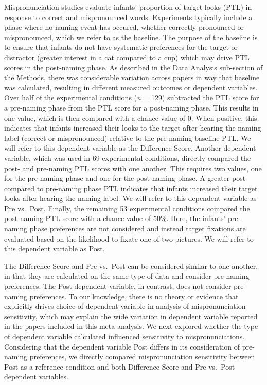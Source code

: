 \documentclass[man]{apa6}
\theoremstyle{definition}
\theoremstyle{definition}
\theoremstyle{definition}
\theoremstyle{remark}
\begin{document}
Mispronunciation studies evaluate infants' proportion of target looks
(PTL) in response to correct and mispronounced words. Experiments
typically include a phase where no naming event has occured, whether
correctly pronounced or mispronounced, which we refer to as the
baseline. The purpose of the baseline is to ensure that infants do not
have systematic preferences for the target or distractor (greater
interest in a cat compared to a cup) which may drive PTL scores in the
post-naming phase. As described in the Data Analysis sub-section of the
Methods, there was considerable variation across papers in way that
baseline was calculated, resulting in different measured outcomes or
dependent variables. Over half of the experimental conditions (\emph{n}
= 129) subtracted the PTL score for a pre-naming phase from the PTL
score for a post-naming phase. This results in one value, which is then
compared with a chance value of 0. When positive, this indicates that
infants increased their looks to the target after hearing the naming
label (correct or mispronounced) relative to the pre-naming baseline
PTL. We will refer to this dependent variable as the Difference Score.
Another dependent variable, which was used in 69 experimental
conditions, directly compared the post- and pre-naming PTL scores with
one another. This requires two values, one for the pre-naming phase and
one for the post-naming phase. A greater post compared to pre-naming
phase PTL indicates that infants increased their target looks after
hearing the naming label. We will refer to this dependent variable as
Pre vs.~Post. Finally, the remaining 53 experimental conditions compared
the post-naming PTL score with a chance value of 50\%. Here, the
infants' pre-naming phase preferences are not considered and instead
target fixations are evaluated based on the likelihood to fixate one of
two pictures. We will refer to this dependent variable as Post.

The Difference Score and Pre vs.~Post can be considered similar to one
another, in that they are calculated on the same type of data and
consider pre-naming preferences. The Post dependent variable, in
contrast, does not consider pre-naming preferences. To our knowledge,
there is no theory or evidence that explicitly drives choice of
dependent variable in analysis of mispronunciation sensitivity, which
may explain the wide variation in dependent variable reported in the
papers included in this meta-analysis. We next explored whether the type
of dependent variable calculated influenced sensitivity to
mispronunciations. Considering that the dependent variable Post differs
in its consideration of pre-naming preferences, we directly compared
mispronunciation sensitivity between Post as a reference condition and
both Difference Score and Pre vs.~Post dependent variables.
\end{document}
